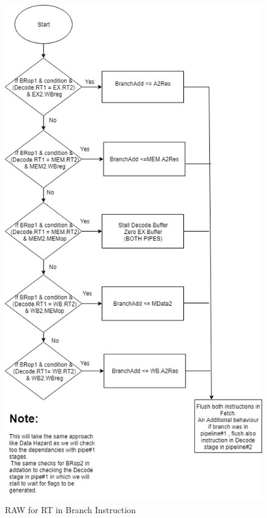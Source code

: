\documentclass[12pt]{article}
\theoremstyle{plain}
\theoremstyle{definition}
\begin{document}
\begin{figure}
    \centering
    \includegraphics[height=0.9\textheight,keepaspectratio]{Diagrams/Hazard.png}
    \caption{RAW for RT in Branch Instruction}
    \label{RAW-BR}
\end{figure}
\end{document}
